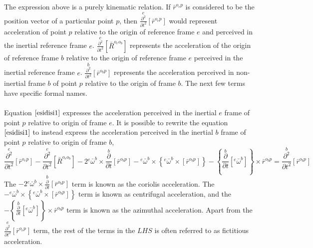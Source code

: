 \documentclass[class=report, 12pt, crop=false]{standalone}
\begin{document}
\begin{center}
The expression above is a purely kinematic relation. If $\displaystyle \bar{r}^{o_{e}p}$ is considered to be the position vector of a particular point $p$, then $\displaystyle \overset{e}{\frac{\partial^{2}}{\partial t^{2}}}[\bar{r}^{o_{e}p}]$ would represent acceleration of point $p$ relative to the origin of reference frame $e$ and perceived in the inertial reference frame $e$. $\displaystyle \overset{e}{\frac{\partial^{2}}{\partial t^{2}}}[\bar{R}^{o_{e}o_{b}}]$ represents the acceleration of the origin of reference frame $b$ relative to the origin of reference frame $e$ perceived in the inertial reference frame $e$. $\displaystyle \overset{b}{\frac{\partial^{2}}{\partial t^{2}}}[\bar{r}^{o_{b}p}]$ represents the acceleration perceived in non-inertial frame $b$ of point $p$ relative to the origin of frame $b$. The next few terms have specific formal names.
\\~\\Equation $\ref{esidisi1}$ expresses the acceleration perceived in the inertial $e$ frame of point $p$ relative to origin of frame $e$. It is possible to rewrite the equation $\ref{esidisi1}$ to instead express the acceleration perceived in the inertial $b$ frame of point $p$ relative to origin of frame $b$,
\begin{equation}\overset{e}{\frac{\partial^{2}}{\partial t^{2}}}[\bar{r}^{o_{e}p}]  -  \overset{e}{\frac{\partial^{2}}{\partial t^{2}}}[\bar{R}^{o_{e}o_{b}}]  -  2{}^{e}\bar{\omega}^{b}\times\overset{b}{\frac{\partial}{\partial t}}[\bar{r}^{o_{b}p}]    -   {}^{e}\bar{\omega}^{b}\times\left\{{}^{e}\bar{\omega}^{b}\times\left[\bar{r}^{o_{b}p}\right]\right\}  -    \left\{\overset{b}{\frac{\partial}{\partial t}}[{}^{e}\bar{\omega}^{b}]\right\}\times\bar{r}^{o_{b}p} =  \overset{b}{\frac{\partial^{2}}{\partial t^{2}}}[\bar{r}^{o_{b}p}]    \label{esidisi2}\end{equation}
The $\displaystyle   -  2{}^{e}\bar{\omega}^{b}\times\overset{b}{\frac{\partial}{\partial t}}[\bar{r}^{o_{b}p}]$ term is known as the coriolis acceleration. The $\displaystyle     -   {}^{e}\bar{\omega}^{b}\times\left\{{}^{e}\bar{\omega}^{b}\times\left[\bar{r}^{o_{b}p}\right]\right\}$ term is known as centrifugal acceleration, and the $\displaystyle   -    \left\{\overset{b}{\frac{\partial}{\partial t}}[{}^{e}\bar{\omega}^{b}]\right\}\times\bar{r}^{o_{b}p}$ term is known as the azimuthal acceleration. Apart from the $\displaystyle \overset{e}{\frac{\partial^{2}}{\partial t^{2}}}[\bar{r}^{o_{e}p}]$ term, the rest of the terms in the $LHS$ is often referred to as fictitious acceleration.

\end{center}
\end{document}
